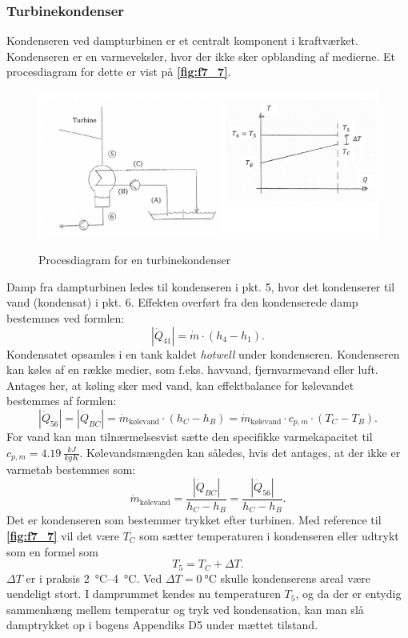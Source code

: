 \subsubsection{Turbinekondenser}
Kondenseren ved dampturbinen er et centralt komponent i kraftværket. Kondenseren er en varmeveksler, hvor der ikke sker opblanding af medierne. Et procesdiagram for dette er vist på \textbf{\autoref{fig:f7_7}}.
\begin{figure} [ht]
  \centering
  \caption{Procesdiagram for en turbinekondenser}
  \includegraphics[width=0.5\linewidth]{./figures/f7_7.png}
  \label{fig:f7_7}
\end{figure}
Damp fra dampturbinen ledes til kondenseren i pkt. 5, hvor det kondenserer til vand (kondensat) i pkt. 6. Effekten overført fra den kondenserede damp bestemmes ved formlen:
\[ 
\left| \dot{Q}_{41} \right| = \dot{m} \cdot \left( h_4 - h_1 \right)
.\]
Kondensatet opsamles i en tank kaldet \textit{hotwell} under kondenseren. Kondenseren kan køles af en række medier, som f.eks. havvand, fjernvarmevand eller luft. Antages her, at køling sker med vand, kan effektbalance for kølevandet bestemmes af formlen:
\[ 
\left| \dot{Q}_{56} \right| = \left| \dot{Q}_{BC} \right| = \dot{m}_{\text{kølevand}} \cdot (h_C - h_B) = \dot{m}_{\text{kølevand}} \cdot c_{p,m} \cdot \left( T_C - T_B \right)
.\]
For vand kan man tilnærmelsesvist sætte den specifikke varmekapacitet til $c_{p,m} = \qty{4,19}{\frac{kJ}{kgK}}$. Køle\-vands\-mæng\-den kan således, hvis det antages, at der ikke er varmetab bestemmes som:
\[ 
\dot{m}_{\text{kølevand}} = \frac{\left| \dot{Q}_{BC} \right|}{h_C - h_B} = \frac{\left| \dot{Q}_{56} \right|}{h_C - h_B}
.\]
Det er kondenseren som bestemmer trykket efter turbinen. Med reference til \textbf{\autoref{fig:f7_7}} vil det være $T_C$ som sætter temperaturen i kondenseren eller udtrykt som en formel som
\[ 
T_5 = T_C + \Delta T
.\]
$\Delta T$ er i praksis \qty{2}{\celsius}--\qty{4}{\celsius}. Ved $\Delta T = \qty{0}{\celsius}$ skulle kondenserens areal være uendeligt stort. I damprummet kendes nu temperaturen $T_5$, og da der er entydig sammenhæng mellem temperatur og tryk ved kondensation, kan man slå damptrykket op i bogens Appendiks D5 under mættet tilstand. 


